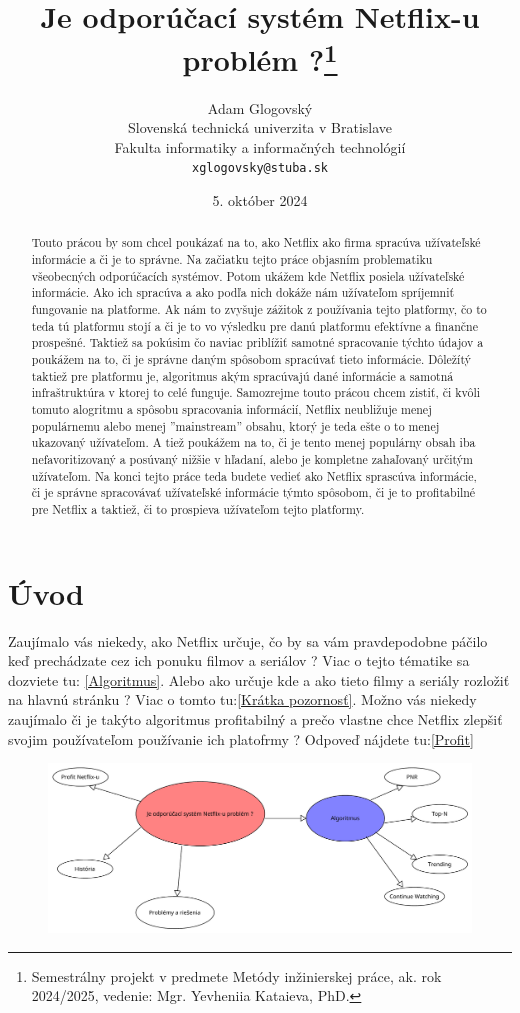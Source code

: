 \documentclass[10pt,twoside,slovak,a4paper]{article}
\title{Je odporúčací systém Netflix-u problém ?\thanks{Semestrálny projekt v predmete Metódy inžinierskej práce, ak. rok 2024/2025, vedenie: Mgr. Yevheniia Kataieva, PhD.}}
\author{Adam Glogovský\\[2pt]
	{\small Slovenská technická univerzita v Bratislave}\\
	{\small Fakulta informatiky a informačných technológií}\\
	{\small \texttt{xglogovsky@stuba.sk}}}
\date{\small 5. október 2024}
\begin{document}
\maketitle
\begin{abstract}
	Touto prácou by som chcel poukázať na to, ako Netflix ako firma spracúva užívateľské informácie a či je to správne. Na začiatku tejto práce objasním problematiku všeobecných odporúčacích systémov. Potom ukážem kde Netflix posiela užívateľské informácie. Ako ich spracúva a ako podľa nich dokáže nám užívateľom spríjemniť fungovanie na platforme. Ak nám to zvyšuje zážitok z používania tejto platformy, čo to teda tú platformu stojí a či je to vo výsledku pre danú platformu efektívne a finančne prospešné. Taktiež sa pokúsim čo naviac priblížiť samotné spracovanie týchto údajov a poukážem na to, či je správne daným spôsobom spracúvať tieto informácie.\cite{amatriain2015recommender}
	Dôležítý taktiež pre platformu je, algoritmus akým spracúvajú dané informácie a samotná infraštruktúra v ktorej to celé funguje. Samozrejme touto prácou chcem zistiť, či kvôli tomuto alogritmu a spôsobu spracovania informácií, Netflix neubližuje menej populárnemu alebo menej ''mainstream'' obsahu, ktorý je teda ešte o to menej ukazovaný užívateľom. A tiež poukážem na to, či je tento menej populárny obsah iba nefavoritizovaný a posúvaný nižšie v hľadaní, alebo je kompletne zahaľovaný určitým užívateľom. Na konci tejto práce teda budete vedieť ako Netflix sprascúva informácie, či je správne spracovávať užívateľské informácie týmto spôsobom, či je to profitabilné pre Netflix a taktiež, či to prospieva užívateľom tejto platformy.
\end{abstract}

\section*{Úvod}
Zaujímalo vás niekedy, ako Netflix určuje, čo by sa vám pravdepodobne páčilo keď prechádzate cez ich ponuku filmov a seriálov ? Viac o tejto tématike sa dozviete tu: \ref{Algoritmus}. Alebo ako určuje kde a ako tieto filmy a seriály rozložiť na hlavnú stránku ? Viac o tomto tu:\ref{Krátka pozornosť}. Možno vás niekedy zaujímalo či je takýto algoritmus profitabilný a prečo vlastne chce Netflix zlepšiť svojim používateľom používanie ich platofrmy ? Odpoveď nájdete tu:\ref{Profit}

\newpage
\begin{figure}[h]
	\centering
	\includegraphics[scale=0.4]{UvodnyDiagram.pdf}
\end{figure}
\end{document}
